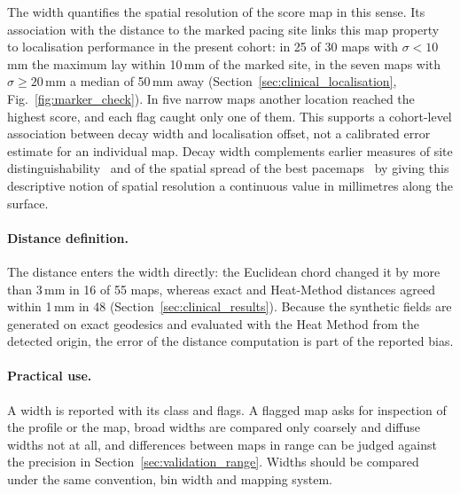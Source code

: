 \documentclass[a4paper,fleqn]{cas-dc}
\begin{document}
The width quantifies the spatial resolution of the score map in this
sense.  Its
association with the distance to the marked pacing site links this map
property to localisation performance in the present cohort: in 25 of
30 maps with $\sigma < 10$\,mm the maximum lay within 10\,mm of the
marked site, in the seven maps with $\sigma \ge 20$\,mm a median of
50\,mm away (Section~\ref{sec:clinical_localisation},
Fig.~\ref{fig:marker_check}).  In five narrow maps another location
reached the highest score, and each flag caught only one of them.  This supports a
cohort-level association between decay width and localisation offset,
not a calibrated error estimate for an individual map.
Decay width complements earlier measures of site
distinguishability~\citep{kadish1991} and of the spatial spread of the
best pacemaps~\citep{azegami2005} by giving this descriptive notion of
spatial resolution a continuous value in millimetres along the surface.

\paragraph{Distance definition.}
The distance enters the width directly: the Euclidean chord changed it
by more than 3\,mm in 16 of 55 maps, whereas exact and Heat-Method
distances agreed within 1\,mm in 48 (Section~\ref{sec:clinical_results}).
Because the synthetic fields are generated on exact geodesics and
evaluated with the Heat Method from the detected origin, the error of
the distance computation is part of the reported bias.

\paragraph{Practical use.}
A width is reported with its class and flags.  A flagged map asks for
inspection of the profile or the map, broad widths are compared only
coarsely and diffuse widths not at all, and differences between maps in
range can be judged against the precision in
Section~\ref{sec:validation_range}.  Widths should be compared under
the same convention, bin width and mapping system.
\end{document}
